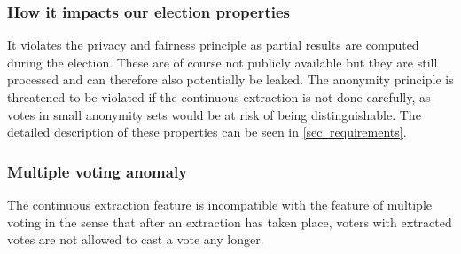 \subsubsection{How it impacts our election properties}
It violates the privacy and fairness principle as partial results are computed during the election. These are of course not publicly available but they are still processed and can therefore also potentially be leaked.
The anonymity principle is threatened to be violated if the continuous extraction is not done carefully, as votes in small anonymity sets would be at risk of being distinguishable. The detailed description of these properties can be seen in \cref{sec: requirements}.


\subsubsection{Multiple voting anomaly}
The continuous extraction feature is incompatible with the feature of multiple voting in the sense that after an extraction has taken place, voters with extracted votes are not allowed to cast a vote any longer.
